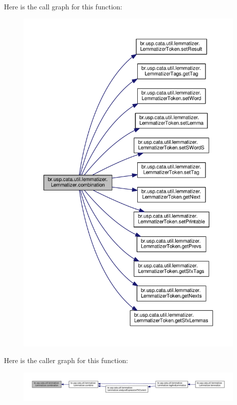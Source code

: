 Here is the call graph for this function\+:\nopagebreak
\begin{figure}[H]
\begin{center}
\leavevmode
\includegraphics[width=350pt]{classbr_1_1usp_1_1cata_1_1util_1_1lemmatizer_1_1_lemmatizer_adbd5fccfe564bfe05ee2888e0c1e92c1_cgraph}
\end{center}
\end{figure}




Here is the caller graph for this function\+:\nopagebreak
\begin{figure}[H]
\begin{center}
\leavevmode
\includegraphics[width=350pt]{classbr_1_1usp_1_1cata_1_1util_1_1lemmatizer_1_1_lemmatizer_adbd5fccfe564bfe05ee2888e0c1e92c1_icgraph}
\end{center}
\end{figure}


